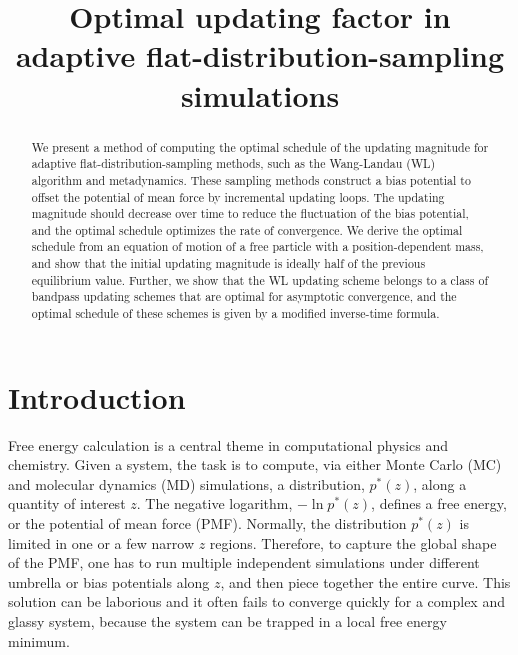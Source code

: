 \documentclass[reprint, floatfix]{revtex4-1}
\begin{document}
\title{Optimal updating factor in adaptive flat-distribution-sampling simulations}



\begin{abstract}
  We present a method of computing the optimal schedule
  of the updating magnitude
  for adaptive flat-distribution-sampling methods,
  such as the Wang-Landau (WL) algorithm and metadynamics.
  These sampling methods
  construct a bias potential to offset
  the potential of mean force
  by incremental updating loops.
  The updating magnitude should decrease over time
  to reduce the fluctuation of the bias potential,
  and the optimal schedule optimizes
  the rate of convergence.
  We derive the optimal schedule from
  an equation of motion
  of a free particle with a position-dependent mass,
  and show that
  the initial updating magnitude is ideally half of
  the previous equilibrium value.
  Further,
  we show that the WL updating scheme
  belongs to a class of bandpass updating schemes
  that are optimal for asymptotic convergence,
  and the optimal schedule of these schemes
  is given by a modified inverse-time formula.
\end{abstract}

\maketitle



\section{Introduction}



Free energy calculation\cite{frenkel, newman} is a central theme
in computational physics and chemistry.
%
Given a system,
the task is to compute,
via either Monte Carlo\cite{frenkel, newman, landau_binder} (MC)
and molecular dynamics\cite{frenkel, karplus2002} (MD) simulations,
a distribution, $p^*(z)$,
along a quantity of interest $z$.
%
The negative logarithm,
$-\ln p^*(z)$,
defines a free energy,
or the potential of mean force (PMF).
%
Normally, the distribution $p^*(z)$ is
limited in one or a few narrow $z$ regions.
%
Therefore, to capture the global shape
of the PMF,
one has to run multiple independent simulations
under different umbrella or bias potentials
along $z$\cite{mezei1987, berg1992, lee1993},
and then piece together the entire curve.
%
This solution can be laborious %
and it often fails to converge quickly
for a complex and glassy system,
because the system can be trapped
in a local free energy minimum.
\end{document}
